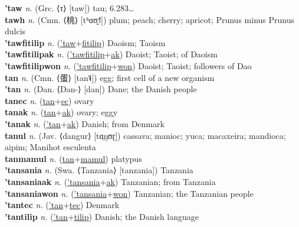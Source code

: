 \textbf{'taw} \textit{n.} (Grc. ⟨τ⟩ [taw])
tau; 6.283… \label{'taw} \\
\textbf{tawh} \textit{n.} (Cmn. ⟨桃⟩ [tʰɑʊ̯˧˥])
plum; peach; cherry; apricot; Prunus minus Prunus dulcis \label{tawh} \\
\textbf{'tawfitilip} \textit{n.} (\hyperref['taw]{'taw}+\hyperref[fitilip]{fitilip})
Daoism; Taoism \label{'tawfitilip} \\
\textbf{'tawfitilipak} \textit{n.} (\hyperref['tawfitilip]{'tawfitilip}+\hyperref[ak]{ak})
Daoist; Taoist; of Daoism \label{'tawfitilipak} \\
\textbf{'tawfitilipwon} \textit{n.} (\hyperref['tawfitilip]{'tawfitilip}+\hyperref[won]{won})
Daoist; Taoist; followers of Dao \label{'tawfitilipwon} \\
\textbf{tan} \textit{n.} (Cmn. ⟨蛋⟩ [tan˥˩])
egg; first cell of a new organism \label{tan} \\
\textbf{'tan} \textit{n.} (Dan. ⟨Dan-⟩ [dan])
Dane; the Danish people \label{'tan} \\
\textbf{tanec} \textit{n.} (\hyperref[tan]{tan}+\hyperref[ec]{ec})
ovary \label{tanec} \\
\textbf{tanak} \textit{n.} (\hyperref[tan]{tan}+\hyperref[ak]{ak})
ovary; eggy \label{tanak} \\
\textbf{'tanak} \textit{n.} (\hyperref['tan]{'tan}+\hyperref[ak]{ak})
Danish; from Denmark \label{'tanak} \\
\textbf{tanul} \textit{n.} (Jav. ⟨dangur⟩ [tɑ̤ŋʊɽ])
cassava; manioc; yuca; macaxeira; mandioca; aipim; Manihot esculenta \label{tanul} \\
\textbf{tanmamul} \textit{n.} (\hyperref[tan]{tan}+\hyperref[mamul]{mamul})
platypus \label{tanmamul} \\
\textbf{'tansania} \textit{n.} (Swa. ⟨Tanzania⟩ [tanzania])
Tanzania \label{'tansania} \\
\textbf{'tansaniaak} \textit{n.} (\hyperref['tansania]{'tansania}+\hyperref[ak]{ak})
Tanzanian; from Tanzania \label{'tansaniaak} \\
\textbf{'tansaniawon} \textit{n.} (\hyperref['tansania]{'tansania}+\hyperref[won]{won})
Tanzanian; the Tanzanian people \label{'tansaniawon} \\
\textbf{'tantec} \textit{n.} (\hyperref['tan]{'tan}+\hyperref[tec]{tec})
Denmark \label{'tantec} \\
\textbf{'tantilip} \textit{n.} (\hyperref['tan]{'tan}+\hyperref[tilip]{tilip})
Danish; the Danish language \label{'tantilip} \\
